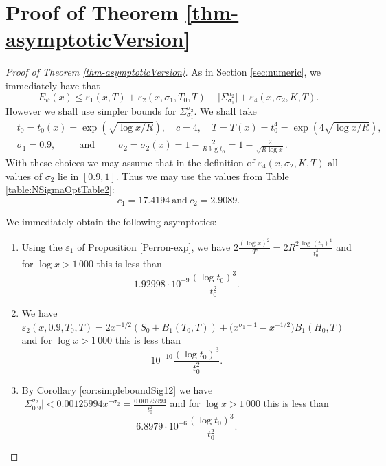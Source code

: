 \documentclass[10pt]{amsart}
\newcommand{\s}{\sigma}
\theoremstyle{definition}
\numberwithin{equation}{section}
\begin{document}
\section{Proof of Theorem \ref{thm-asymptoticVersion}}\label{sec:asymptotic}

\begin{proof}[Proof of Theorem \ref{thm-asymptoticVersion}]
As in Section \ref{sec:numeric}, we immediately have that
\[ E_{\psi}(x) \le  \varepsilon_1(x,T) + \varepsilon_2(x,\sigma_1,T_0,T) +  \Big| \Sigma_{\s_1}^{\s_2}  \Big| +   \varepsilon_4(x,\sigma_2,K,T) .\]
However we shall use simpler bounds for $ \Sigma_{\s_1}^{\s_2} $.
We shall take
\begin{equation}\label{Thm1.2-parameters}
\begin{split}
& t_0 =  t_0(x) = \exp( \sqrt{\log x/R} ) , \quad c= 4, \quad 
T = T(x) =  t_0^4 =\exp(4 \sqrt{\log x/R} ) ,\ \qquad\ \\ 
& \s_1 = 0.9 ,\ \qquad\ 
\text{and}\ \qquad\ 
 \s_2 = \s_2(x) = 1 - \frac{2}{R\log t_0 } = 1 - \frac{2}{\sqrt{R\log x}}.  
\end{split}
\end{equation}
With these choices we may assume that in the definition of $ \varepsilon_4(x,\sigma_2,K,T) $ all values of $\sigma_2$ lie in $ [0.9,1]$. Thus we 
may use the values from Table \ref{table:NSigmaOptTable2}:
\[c_1 = 17.4194  \ \text{and}\ c_2 = 2.9089.\] 

We immediately obtain the following asymptotics:
\begin{enumerate}

\item Using the $\varepsilon_1$ of Proposition \ref{Perron-exp}, we have  $2\frac{(\log x)^2}{T} = 2R^2 \frac{\log(t_0)^4}{t_0^4} $
and for $\log x>1\,000$ this is less than
\[ 1.92998\cdot 10^{-9}  \frac{(\log t_0)^3}{t_0^2}  .\]

\item We have $\varepsilon_2(x,0.9,T_0,T) =  2 x^{-1/2} (S_0 + B_1(T_0,T))
+ \Big( x^{\sigma_1-1} - x^{-1/2} \Big)B_1(H_0, T)$ and for $\log x > 1\,000$ this is less than
\[   10^{-10}    \frac{(\log t_0)^3}{t_0^2} . \]  


\item By Corollary \ref{cor:simpleboundSig12} we have $\Big| \Sigma_{0.9}^{\s_2}  \Big|  <  0.00125994 x^{-\s_2} = \frac{ 0.00125994}{t_0^2}$ and for $\log x>1\,000$  this is less than
\[ 6.8979 \cdot 10^{-6} \frac{(\log t_0)^3}{t_0^2} .\]



\end{enumerate}
\end{proof}
\end{document}
